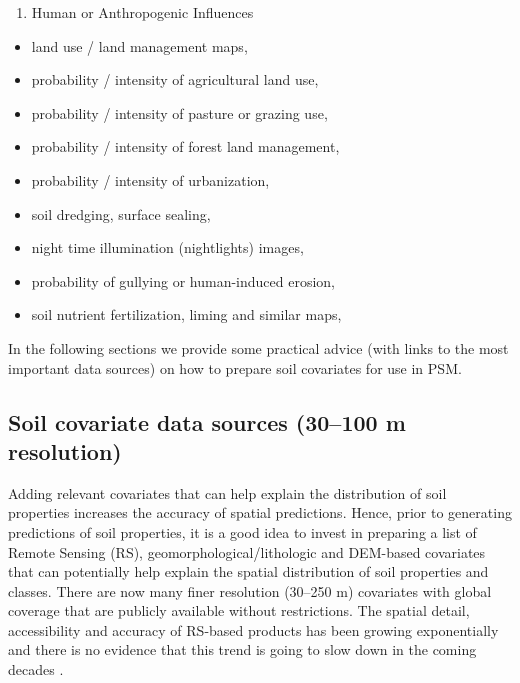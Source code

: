 \documentclass[graybox,natbib,nospthms,UStrade]{svmono}
\providecommand{\tightlist}{%
  \setlength{\itemsep}{0pt}\setlength{\parskip}{0pt}}
\providecommand{\tightlist}{\setlength{\itemsep}{0pt}\setlength{\parskip}{0pt}}
\begin{document}
\begin{enumerate}
\def\labelenumi{\arabic{enumi}.}
\setcounter{enumi}{6}
\tightlist
\item
  Human or Anthropogenic Influences
\end{enumerate}

\begin{itemize}
\tightlist
\item
  land use / land management maps,
\item
  probability / intensity of agricultural land use,
\item
  probability / intensity of pasture or grazing use,
\item
  probability / intensity of forest land management,
\item
  probability / intensity of urbanization,
\item
  soil dredging, surface sealing,
\item
  night time illumination (nightlights) images,
\item
  probability of gullying or human-induced erosion,
\item
  soil nutrient fertilization, liming and similar maps,
\end{itemize}

In the following sections we provide some practical advice (with links to the most important data sources) on how to prepare soil covariates for use in PSM.

\hypertarget{soil-covs-30m}{%
\subsection{Soil covariate data sources (30--100 m resolution)}\label{soil-covs-30m}}

Adding relevant covariates that can help explain the distribution of soil properties increases the accuracy of spatial predictions. Hence, prior to generating predictions of soil properties, it is a good idea to invest in preparing a list of Remote Sensing (RS), geomorphological/lithologic and DEM-based covariates that can potentially help explain the spatial distribution of soil properties and classes. There are now many finer resolution (30--250 m) covariates with global coverage that are publicly available without restrictions. The spatial detail, accessibility and accuracy of RS-based products has been growing exponentially and there is no evidence that this trend is going to slow down in the coming decades \citep{Herold2016}.
\end{document}
